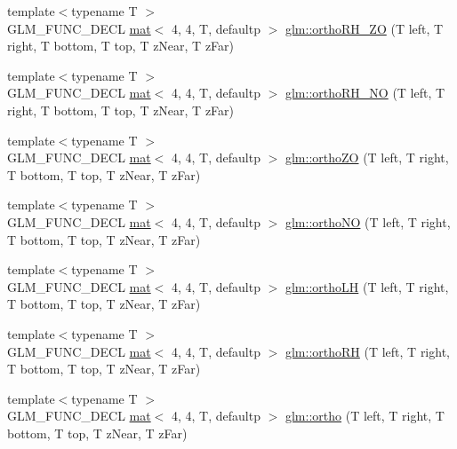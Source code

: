 \begin{DoxyCompactItemize}
\item 
{\footnotesize template$<$typename T $>$ }\\G\+L\+M\+\_\+\+F\+U\+N\+C\+\_\+\+D\+E\+CL \hyperlink{structglm_1_1mat}{mat}$<$ 4, 4, T, defaultp $>$ \hyperlink{group__gtc__matrix__transform_ga9aea2e515b08fd7dce47b7b6ec34d588}{glm\+::ortho\+R\+H\+\_\+\+ZO} (T left, T right, T bottom, T top, T z\+Near, T z\+Far)
\item 
{\footnotesize template$<$typename T $>$ }\\G\+L\+M\+\_\+\+F\+U\+N\+C\+\_\+\+D\+E\+CL \hyperlink{structglm_1_1mat}{mat}$<$ 4, 4, T, defaultp $>$ \hyperlink{group__gtc__matrix__transform_gaa2f7a1373170bf0a4a2ddef9b0706780}{glm\+::ortho\+R\+H\+\_\+\+NO} (T left, T right, T bottom, T top, T z\+Near, T z\+Far)
\item 
{\footnotesize template$<$typename T $>$ }\\G\+L\+M\+\_\+\+F\+U\+N\+C\+\_\+\+D\+E\+CL \hyperlink{structglm_1_1mat}{mat}$<$ 4, 4, T, defaultp $>$ \hyperlink{group__gtc__matrix__transform_gaea11a70817af2c0801c869dea0b7a5bc}{glm\+::ortho\+ZO} (T left, T right, T bottom, T top, T z\+Near, T z\+Far)
\item 
{\footnotesize template$<$typename T $>$ }\\G\+L\+M\+\_\+\+F\+U\+N\+C\+\_\+\+D\+E\+CL \hyperlink{structglm_1_1mat}{mat}$<$ 4, 4, T, defaultp $>$ \hyperlink{group__gtc__matrix__transform_gab219d28a8f178d4517448fcd6395a073}{glm\+::ortho\+NO} (T left, T right, T bottom, T top, T z\+Near, T z\+Far)
\item 
{\footnotesize template$<$typename T $>$ }\\G\+L\+M\+\_\+\+F\+U\+N\+C\+\_\+\+D\+E\+CL \hyperlink{structglm_1_1mat}{mat}$<$ 4, 4, T, defaultp $>$ \hyperlink{group__gtc__matrix__transform_gad122a79aadaa5529cec4ac197203db7f}{glm\+::ortho\+LH} (T left, T right, T bottom, T top, T z\+Near, T z\+Far)
\item 
{\footnotesize template$<$typename T $>$ }\\G\+L\+M\+\_\+\+F\+U\+N\+C\+\_\+\+D\+E\+CL \hyperlink{structglm_1_1mat}{mat}$<$ 4, 4, T, defaultp $>$ \hyperlink{group__gtc__matrix__transform_ga16264c9b838edeb9dd1de7a1010a13a4}{glm\+::ortho\+RH} (T left, T right, T bottom, T top, T z\+Near, T z\+Far)
\item 
{\footnotesize template$<$typename T $>$ }\\G\+L\+M\+\_\+\+F\+U\+N\+C\+\_\+\+D\+E\+CL \hyperlink{structglm_1_1mat}{mat}$<$ 4, 4, T, defaultp $>$ \hyperlink{group__gtc__matrix__transform_ga6615d8a9d39432e279c4575313ecb456}{glm\+::ortho} (T left, T right, T bottom, T top, T z\+Near, T z\+Far)

\end{DoxyCompactItemize}

